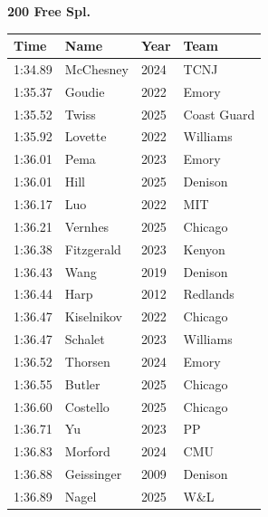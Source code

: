 \noindent\begin{minipage}[t]{0.98\textwidth}
\centering
\textbf{\textcolor{teamprimary}{200 Free Spl.}}\par
\vspace{0.5em}
\centering
\small
\renewcommand{\arraystretch}{1.0}
\setlength{\tabcolsep}{4pt}
\begin{tabular}{@{}p{2.5cm}p{4.5cm}p{1.5cm}p{2.5cm}@{}}
\toprule
\textbf{Time} & \textbf{Name} & \textbf{Year} & \textbf{Team} \\
\midrule
1:34.89 & McChesney & 2024 & TCNJ \\
1:35.37 & Goudie & 2022 & Emory \\
1:35.52 & Twiss & 2025 & Coast Guard \\
1:35.92 & Lovette & 2022 & Williams \\
1:36.01 & Pema & 2023 & Emory \\
1:36.01 & Hill & 2025 & Denison \\
1:36.17 & Luo & 2022 & MIT \\
1:36.21 & Vernhes & 2025 & Chicago \\
1:36.38 & Fitzgerald & 2023 & Kenyon \\
1:36.43 & Wang & 2019 & Denison \\
1:36.44 & Harp & 2012 & Redlands \\
1:36.47 & Kiselnikov & 2022 & Chicago \\
1:36.47 & Schalet & 2023 & Williams \\
1:36.52 & Thorsen & 2024 & Emory \\
1:36.55 & Butler & 2025 & Chicago \\
1:36.60 & Costello & 2025 & Chicago \\
1:36.71 & Yu & 2023 & PP \\
1:36.83 & Morford & 2024 & CMU \\
1:36.88 & Geissinger & 2009 & Denison \\
1:36.89 & Nagel & 2025 & W\&L \\
\bottomrule
\end{tabular}
\end{minipage}
\vspace{1.2em}
